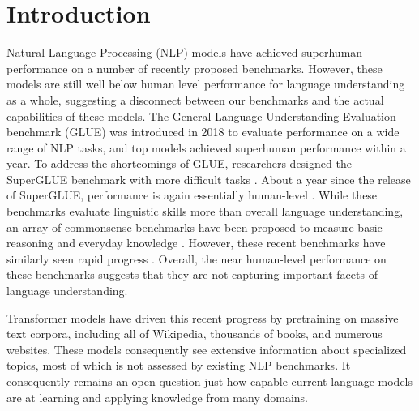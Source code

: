 \section{Introduction}

Natural Language Processing (NLP) models have achieved superhuman performance on a number of recently proposed benchmarks. 
However, these models are still well below human level performance for language understanding as a whole, suggesting a disconnect between our benchmarks and the actual capabilities of these models. 
The General Language Understanding Evaluation benchmark (GLUE) \citep{wang2018glue} was introduced in 2018 to evaluate performance on a wide range of NLP tasks, and top models achieved superhuman performance within a year. To address the shortcomings of GLUE, researchers designed the SuperGLUE benchmark with more difficult tasks \citep{wang2019superglue}. About a year since the release of SuperGLUE, performance is again essentially human-level \citep{raffel2019exploringT5}. While these benchmarks evaluate linguistic skills more than overall language understanding, an array of commonsense benchmarks have been proposed to measure basic reasoning and everyday knowledge \citep{zellers2019hellaswag,huang2019cosmosqa,bisk2019physicaliqa}. 
However, these recent benchmarks have similarly seen rapid progress \citep{khashabi2020unifiedqa}. Overall, the near human-level performance on these benchmarks suggests that they are not capturing important facets of language understanding.

Transformer models have driven this recent progress by pretraining on massive text corpora, including all of Wikipedia, thousands of books, and numerous websites. These models consequently see extensive information about specialized topics, most of which is not assessed by existing NLP benchmarks. 
It consequently remains an open question just how capable current language models are at learning and applying knowledge from many domains.

